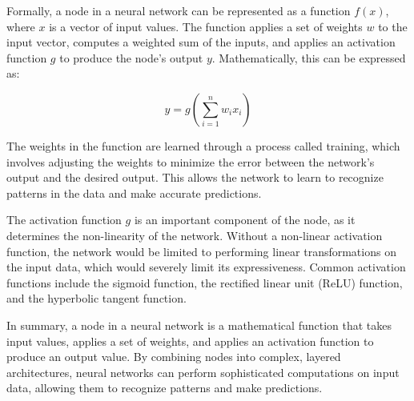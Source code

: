 \documentclass{article}
\begin{document}
Formally, a node in a neural network can be represented as a function $f(x)$, where $x$ is a vector of input values. The function applies a set of weights $w$ to the input vector, computes a weighted sum of the inputs, and applies an activation function $g$ to produce the node's output $y$. Mathematically, this can be expressed as:

\begin{equation}
    y = g(\sum_{i=1}^{n} w_i x_i)
\end{equation}

The weights in the function are learned through a process called training, which involves adjusting the weights to minimize the error between the network's output and the desired output. This allows the network to learn to recognize patterns in the data and make accurate predictions.

The activation function $g$ is an important component of the node, as it determines the non-linearity of the network. Without a non-linear activation function, the network would be limited to performing linear transformations on the input data, which would severely limit its expressiveness. Common activation functions include the sigmoid function, the rectified linear unit (ReLU) function, and the hyperbolic tangent function.

In summary, a node in a neural network is a mathematical function that takes input values, applies a set of weights, and applies an activation function to produce an output value. By combining nodes into complex, layered architectures, neural networks can perform sophisticated computations on input data, allowing them to recognize patterns and make predictions.

\end{document}
